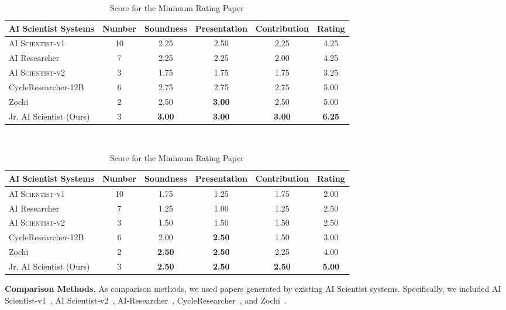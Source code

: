 \begin{table}[t]
\begin{subtable}[t]{1\textwidth}
\begin{adjustbox}{width=\textwidth}
\begin{tabular}{lccccc}
\toprule
\textbf{AI Scientist Systems} & \textbf{Number}  & \textbf{Soundness} & \textbf{Presentation} & \textbf{Contribution} & \textbf{Rating}\\
\midrule
\textsc{AI Scientist-v1} & 10  & 2.25 & 2.50 & 2.25 & 4.25 \\
AI Researcher & 7 & 2.25 & 2.25 & 2.00 & 4.25\\
\textsc{AI Scientist-v2} & 3 & 1.75 & 1.75 & 1.75 & 3.25 \\
CycleResearcher-12B & 6  & 2.75 & 2.75 & 2.75 & 5.00\\
Zochi & 2  & 2.50 & \textbf{3.00} & 2.50 & 5.00 \\
Jr. AI Scientist (Ours) & 3  & \textbf{3.00} & \textbf{3.00} & \textbf{3.00} & \textbf{6.25} \\
\bottomrule
\end{tabular}
\end{adjustbox}
\end{subtable}
\hfill
\\
\begin{subtable}[t]{1\textwidth}
\centering
\caption{Score for the Minimum Rating Paper}
\begin{adjustbox}{width=\textwidth}
\begin{tabular}{lccccc}
\toprule
\textbf{AI Scientist Systems} & \textbf{Number}  & \textbf{Soundness} & \textbf{Presentation} & \textbf{Contribution} & \textbf{Rating}\\
\midrule
\textsc{AI Scientist-v1} & 10  & 1.75 & 1.25 & 1.75 & 2.00\\
AI Researcher & 7 & 1.25 & 1.00 & 1.25 & 2.50 \\
\textsc{AI Scientist-v2} & 3 & 1.50 & 1.50 & 1.50 & 2.50  \\
CycleResearcher-12B & 6  & 2.00 & \textbf{2.50} & 1.50 & 3.00\\
Zochi & 2  & \textbf{2.50} & \textbf{2.50} & 2.25 & 4.00 \\
Jr. AI Scientist (Ours) & 3  & \textbf{2.50} & \textbf{2.50} & \textbf{2.50} & \textbf{5.00} \\
\bottomrule
\end{tabular}
\end{adjustbox}
\end{subtable}
\label{table:ai_reviewer_score}
\end{table}


\textbf{Comparison Methods.}
As comparison methods, we used papers generated by existing AI Scientist systems.
Specifically, we included AI Scientist-v1~\citep{lu2024ai}, AI Scientist-v2~\citep{yamada2025ai}, AI-Researcher~\citep{tang2025ai}, CycleResearcher~\citep{weng2024cycleresearcher}, and Zochi~\citep{zochi2025}.

